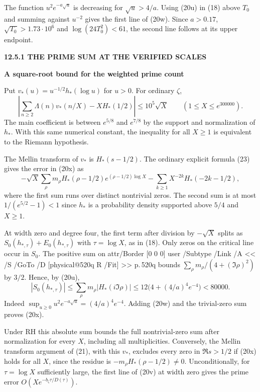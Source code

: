 \documentclass[11pt,letterpaper]{article}
\makeatletter
\newcommand{\rightmarktext}{}
\newcommand{\printfolio}{}
\newcommand{\leaf}[4]{\clearpage\gdef\printfolio{#1}\gdef\rightmarktext{#2}%
  {\small\sffamily\bfseries\color{ink}#3\par}\vspace{3pt}%
  {\LARGE\bfseries #4\par}\vspace{5pt}}
\newcommand{\MusicPDFPageRef}[1]{\pdfpageref\csname physical@#1\endcsname\space\space 0 R}
\newcommand{\pagelink}[2]{\leavevmode\pdfstartlink attr{/Border [0 0 0]} user{%
  /Subtype /Link /A << /S /GoTo /D [\MusicPDFPageRef{#1} /Fit] >>}%
  {\color{ink}#2}\pdfendlink}
\newcommand{\pg}[1]{\pagelink{#1}{p.\,#1}}
\makeatother
\begin{document}
The function $u^2 e^{-a\sqrt u}$ is decreasing for $\sqrt u>4/a$.
Using (20u) in (18) above $T_0$ and summing against $u^{-2}$ gives
the first line of (20w). Since $a>0.17$, $\sqrt{T_0}>1.73\cdot10^6$
and $\log(24T_0^2)<61$, the second line follows at its upper endpoint.

\leaf{520r}{A finite square-root estimate}{12.5.1 \quad THE PRIME SUM AT THE VERIFIED SCALES}{A square-root bound for the weighted prime count}
Put $v_*(u)=u^{-1/2}h_*(\log u)$ for $u>0$. For ordinary $\zeta$,
\[
 \left|\sum_{n\ge2}\Lambda(n)v_*(n/X)-XH_*(1/2)\right|
       \le 10^5\sqrt X \qquad(1\le X\le e^{300000}).
 \tag{20x}
\]
The main coefficient is between $e^{5/8}$ and $e^{7/8}$ by the
support and normalization of $h_*$. With this same numerical constant,
the inequality for all $X\ge1$ is equivalent to the Riemann hypothesis.

The Mellin transform of $v_*$ is $H_*(s-1/2)$. The ordinary explicit
formula (23) gives the error in (20x) as
\[
 -\sqrt X\sum_\rho m_\rho H_*(\rho-1/2)e^{(\rho-1/2)\log X}
       -\sum_{k\ge1} X^{-2k}H_*(-2k-1/2),
\]
where the first sum runs over distinct nontrivial zeros. The second
sum is at most $1/(e^{5/2}-1)<1$ since $h_*$ is a probability
density supported above $5/4$ and $X\ge1$.

At width zero and degree four, the first term after division by
$-\sqrt X$ splits as $S_0(h_{*,\tau})+E_0(h_{*,\tau})$ with
$\tau=\log X$, as in (18). Only zeros on the critical line occur
in $S_0$. The positive sum on \pg{520q} bounds
$\sum_\rho m_\rho/(4+(\Im\rho)^2)$ by $3/2$. Hence, by (20u),
\[
 |S_0(h_{*,\tau})|
 \le \sum_\rho m_\rho |H_*(i\Im\rho)|
 \le 12\big(4+(4/a)^4e^{-4}\big)<80000 .
\]
Indeed $\sup_{u\ge0}u^2e^{-a\sqrt u}=(4/a)^4e^{-4}$. Adding (20w)
and the trivial-zero sum proves (20x).

Under RH this absolute sum bounds the full nontrivial-zero sum
after normalization for every $X$, including all multiplicities.
Conversely, the Mellin transform argument of (21), with this $v_*$,
excludes every zero in $\Re s>1/2$ if (20x) holds for all $X$,
since the residue is $-m_\rho H_*(\rho-1/2)\ne0$. Unconditionally, for
$\tau=\log X$ sufficiently large, the first line of (20v) at width
zero gives the prime error $O(Xe^{-b_\zeta\tau/D(\tau)})$.
\end{document}
